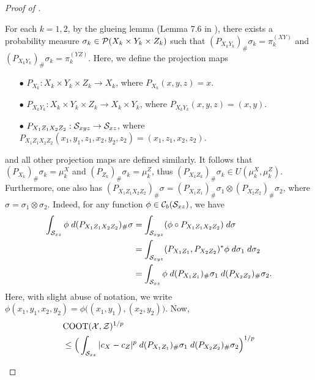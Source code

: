 \begin{proof}[Proof of ]
\begin{enumerate}
      For each $k = 1,2$, by the glueing lemma (Lemma 7.6 in \citep{Villani03}), there exists a probability measure
      $\sigma_k \in \mathcal P(X_k \times Y_k \times Z_k)$ such that
      $(P_{X_k Y_k})_{\#} \sigma_k = \pi^{(XY)}_k$ and
      $(P_{X_k Y_k})_{\#} \sigma_k = \pi^{(YZ)}_k$. Here, we define the projection maps
      \begin{itemize}
        \item[$\bullet$] $P_{X_k}: X_k \times Y_k \times Z_k \to X_k$, where
        $P_{X_k}(x,y,z) = x$.
        \item[$\bullet$] $P_{X_k Y_k}: X_k \times Y_k \times Z_k \to X_k \times Y_k$,
        where $P_{X_k Y_k}(x,y,z) = (x,y)$.
        \item[$\bullet$] $P_{X_1 Z_1 X_2 Z_2}: \mathcal S_{xyz} \to \mathcal S_{xz}$, where
        $P_{X_1 Z_1 X_2 Z_2}(x_1,y_1,z_1, x_2, y_2, z_2) = (x_1,z_1, x_2, z_2)$.
      \end{itemize}
      and all other projection maps are defined similarly. It follows that
      $(P_{X_k})_{\#} \sigma_k = \mu_k^X$ and $(P_{Z_k})_{\#} \sigma_k = \mu_k^Z$, thus
      $(P_{X_k Z_k})_{\#} \sigma_k \in U(\mu_k^X, \mu_k^Z)$. Furthermore, one also has
      $(P_{X_1 Z_1 X_2 Z_2})_{\#} \sigma =
      (P_{X_1 Z_1})_{\#} \sigma_1 \otimes (P_{X_2 Z_2})_{\#} \sigma_2$,
      where $\sigma = \sigma_1 \otimes \sigma_2$. Indeed, for any function $\phi \in \mathcal C_b(\mathcal S_{xz})$, we have
      \begin{equation}
        \begin{split}
          \int_{\mathcal S_{xz}} \phi \; d(P_{X_1 Z_1 X_2 Z_2})_{\#} \sigma
          &= \int_{\mathcal S_{xyz}} (\phi \circ P_{X_1 Z_1 X_2 Z_2}) \; d\sigma \\
          &= \int_{\mathcal S_{xyz}} (P_{X_1 Z_1}, P_{X_2 Z_2})^*\phi
          \; d \sigma_1 \; d \sigma_2 \\
          &= \int_{\mathcal S_{xz}} \phi \; d (P_{X_1 Z_1})_{\#} \sigma_1 \;
          d (P_{X_2 Z_2})_{\#} \sigma_2.
        \end{split}
      \end{equation}
      Here, with slight abuse of notation, we write $\phi(x_1,y_1, x_2,y_2) = \phi\big( (x_1,y_1), (x_2,y_2) \big)$. Now,
      \begin{equation}
        \begin{split}
          &\coot(\cX, \cZ)^{1/p} \\
          &\leq \Big( \int_{\cS_{xz}} \vert c_X - c_Z \vert^p
          \; d (P_{X_1 Z_1})_{\#} \sigma_1 \; d (P_{X_2 Z_2})_{\#} \sigma_2 \Big)^{1/p} \\

\end{split}
\end{equation}
\end{enumerate}
\end{proof}
